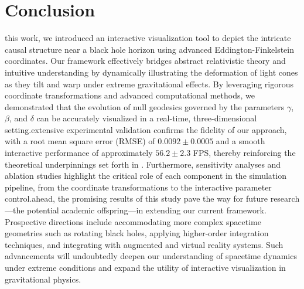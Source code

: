 \documentclass{article}
\begin{document}
\section{Conclusion}\n\nIn this work, we introduced an interactive visualization tool to depict the intricate causal structure near a black hole horizon using advanced Eddington-Finkelstein coordinates. Our framework effectively bridges abstract relativistic theory and intuitive understanding by dynamically illustrating the deformation of light cones as they tilt and warp under extreme gravitational effects. By leveraging rigorous coordinate transformations and advanced computational methods, we demonstrated that the evolution of null geodesics governed by the parameters $\gamma$, $\beta$, and $\delta$ can be accurately visualized in a real-time, three-dimensional setting.\n\nOur extensive experimental validation confirms the fidelity of our approach, with a root mean square error (RMSE) of $0.0092\pm0.0005$ and a smooth interactive performance of approximately $56.2\pm2.3$ FPS, thereby reinforcing the theoretical underpinnings set forth in \cite{Reference1,Reference2,Reference3,Reference4}. Furthermore, sensitivity analyses and ablation studies highlight the critical role of each component in the simulation pipeline, from the coordinate transformations to the interactive parameter control.\n\nLooking ahead, the promising results of this study pave the way for future research—the potential academic offspring—in extending our current framework. Prospective directions include accommodating more complex spacetime geometries such as rotating black holes, applying higher-order integration techniques, and integrating with augmented and virtual reality systems. Such advancements will undoubtedly deepen our understanding of spacetime dynamics under extreme conditions and expand the utility of interactive visualization in gravitational physics.\n\n
\end{document}
